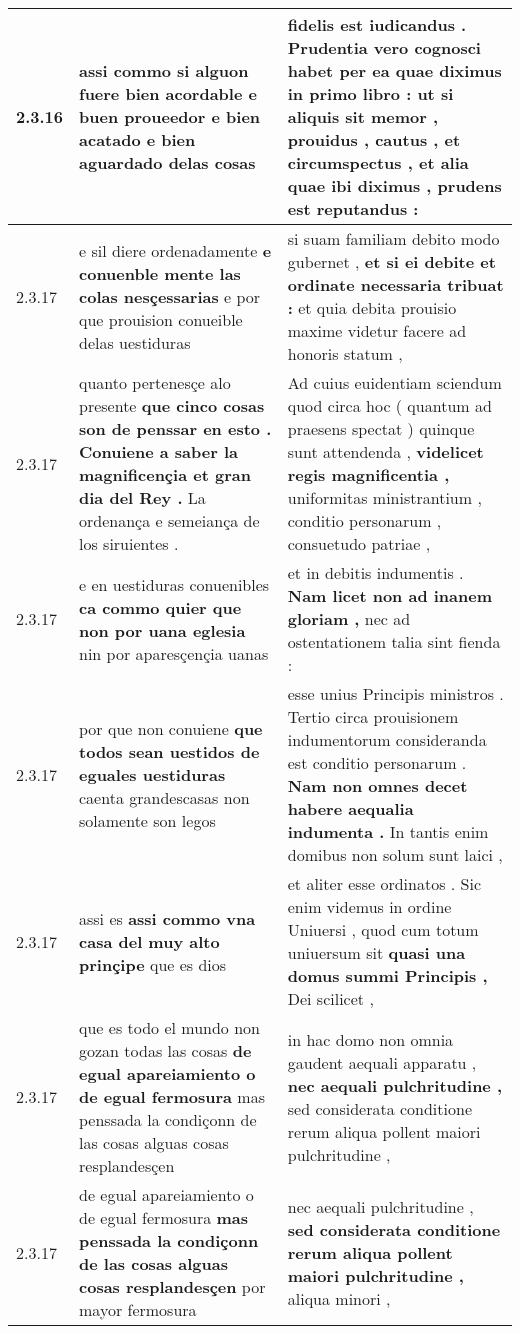 \begin{tabular}{|p{1cm}|p{6.5cm}|p{6.5cm}|}
2.3.16 & assi commo si alguon fuere bien acordable \textbf{ e buen proueedor } e bien acatado e bien aguardado delas cosas & fidelis est iudicandus . Prudentia vero cognosci habet per ea quae diximus in primo libro : \textbf{ ut si aliquis sit memor , prouidus , cautus , et circumspectus , et alia quae ibi diximus , } prudens est reputandus : \\\hline
2.3.17 & e sil diere ordenadamente \textbf{ e conuenble mente las colas nesçessarias } e por que prouision conueible delas uestiduras & si suam familiam debito modo gubernet , \textbf{ et si ei debite et ordinate necessaria tribuat : } et quia debita prouisio maxime videtur facere ad honoris statum , \\\hline
2.3.17 & quanto pertenesçe alo presente \textbf{ que cinco cosas son de penssar en esto . Conuiene a saber la magnificençia et gran dia del Rey . } La ordenança e semeiança de los siruientes . & Ad cuius euidentiam sciendum quod circa hoc ( quantum ad praesens spectat ) quinque sunt attendenda , \textbf{ videlicet regis magnificentia , } uniformitas ministrantium , conditio personarum , consuetudo patriae , \\\hline
2.3.17 & e en uestiduras conuenibles \textbf{ ca commo quier que non por uana eglesia } nin por aparesçençia uanas & et in debitis indumentis . \textbf{ Nam licet non ad inanem gloriam , } nec ad ostentationem talia sint fienda : \\\hline
2.3.17 & por que non conuiene \textbf{ que todos sean uestidos de eguales uestiduras } caenta grandescasas non solamente son legos & esse unius Principis ministros . Tertio circa prouisionem indumentorum consideranda est conditio personarum . \textbf{ Nam non omnes decet habere aequalia indumenta . } In tantis enim domibus non solum sunt laici , \\\hline
2.3.17 & assi es \textbf{ assi commo vna casa del muy alto prinçipe } que es dios & et aliter esse ordinatos . Sic enim videmus in ordine Uniuersi , quod cum totum uniuersum sit \textbf{ quasi una domus summi Principis , } Dei scilicet , \\\hline
2.3.17 & que es todo el mundo non gozan todas las cosas \textbf{ de egual apareiamiento o de egual fermosura } mas penssada la condiçonn de las cosas alguas cosas resplandesçen & in hac domo non omnia gaudent aequali apparatu , \textbf{ nec aequali pulchritudine , } sed considerata conditione rerum aliqua pollent maiori pulchritudine , \\\hline
2.3.17 & de egual apareiamiento o de egual fermosura \textbf{ mas penssada la condiçonn de las cosas alguas cosas resplandesçen } por mayor fermosura & nec aequali pulchritudine , \textbf{ sed considerata conditione rerum aliqua pollent maiori pulchritudine , } aliqua minori , \\\hline

\end{tabular}
